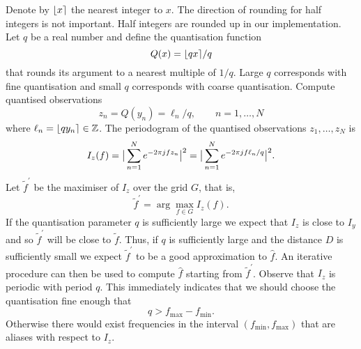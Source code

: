 \documentclass[10pt,twocolumn,twoside]{IEEEtran}
\begin{document}
Denote by ${\left\lfloor x \right\rceil}$ the nearest integer to $x$.  The direction of rounding for half integers is not important.  Half integers are rounded up in our implementation.  Let $q$ be a real number and define the quantisation function
\[
Q(x) = {\left\lfloor qx \right\rceil}/q
\]
that rounds its argument to a nearest multiple of $1/q$.  Large $q$ corresponds with fine quantisation and small $q$ corresponds with coarse quantisation.  Compute quantised observations
\[
z_n = Q(y_n) =  \ell_n/q, \qquad n = 1,\dots,N
\]
where $\ell_n = {\left\lfloor qy_n \right\rceil} \in {\mathbb Z}$.  The periodogram of the quantised observations $z_1,\dots,z_N$ is
\begin{align*}
I_z(f) = \big\vert  \sum_{n=1}^N e^{ -2\pi j f z_n}  \big\vert^2 = \big\vert  \sum_{n=1}^N e^{ -2\pi j f \ell_n/q}  \big\vert^2.
\end{align*}
Let $\widetilde{f}^\prime$ be the maximiser of $I_z$ over the grid $G$, that is,
\[
\widetilde{f}^\prime = \arg\max_{f \in G} I_z(f).
\]
If the quantisation parameter $q$ is sufficiently large we expect that $I_z$ is close to $I_y$ and so $\widetilde{f}^\prime$ will be close to $\widetilde{f}$.  Thus, if $q$ is sufficiently large and the distance $D$ is sufficiently small we expect $\widetilde{f}^\prime$ to be a good approximation to $\hat{f}$.  An iterative procedure %
can then be used to compute $\hat{f}$ starting from $\widetilde{f}^\prime$.  
Observe that $I_z$ is periodic with period $q$.  This immediately indicates that we should choose the quantisation fine enough that 
\begin{equation}\label{eq:boundaliasingP}
q > f_{\text{max}} - f_{\text{min}}.
\end{equation}
Otherwise there would exist frequencies in the interval $(f_{\text{min}}, f_{\text{max}})$ that are aliases with respect to $I_z$.  %
\end{document}
